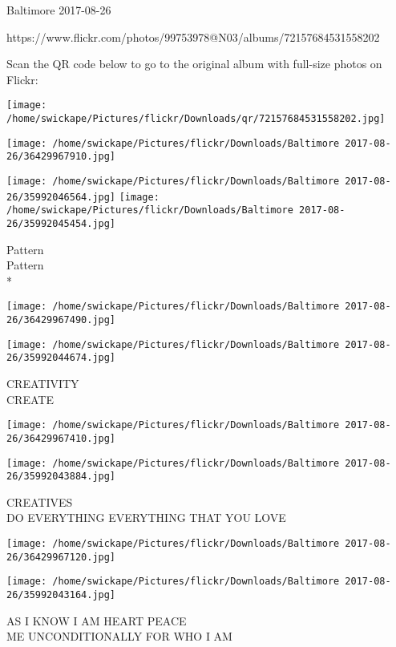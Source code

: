 \documentclass[10pt,letterpaper]{article}
\begin{document}
Baltimore 2017-08-26

https://www.flickr.com/photos/99753978@N03/albums/72157684531558202

Scan the QR code below to go to the original album with full-size photos on Flickr:

\texttt{[image: /home/swickape/Pictures/flickr/Downloads/qr/72157684531558202.jpg]}
\pagebreak

\texttt{[image: /home/swickape/Pictures/flickr/Downloads/Baltimore 2017-08-26/36429967910.jpg]}

\vspace{0.25in}
\texttt{[image: /home/swickape/Pictures/flickr/Downloads/Baltimore 2017-08-26/35992046564.jpg]}
\texttt{[image: /home/swickape/Pictures/flickr/Downloads/Baltimore 2017-08-26/35992045454.jpg]}

Pattern\\
Pattern\\
*\\
\pagebreak

\texttt{[image: /home/swickape/Pictures/flickr/Downloads/Baltimore 2017-08-26/36429967490.jpg]}

\vspace{0.25in}
\texttt{[image: /home/swickape/Pictures/flickr/Downloads/Baltimore 2017-08-26/35992044674.jpg]}

CREATIVITY\\
CREATE\\
\pagebreak

\texttt{[image: /home/swickape/Pictures/flickr/Downloads/Baltimore 2017-08-26/36429967410.jpg]}

\vspace{0.25in}
\texttt{[image: /home/swickape/Pictures/flickr/Downloads/Baltimore 2017-08-26/35992043884.jpg]}

CREATIVES\\
DO EVERYTHING EVERYTHING THAT YOU LOVE\\
\pagebreak

\texttt{[image: /home/swickape/Pictures/flickr/Downloads/Baltimore 2017-08-26/36429967120.jpg]}

\vspace{0.25in}
\texttt{[image: /home/swickape/Pictures/flickr/Downloads/Baltimore 2017-08-26/35992043164.jpg]}

AS I KNOW I AM HEART PEACE\\
ME UNCONDITIONALLY FOR WHO I AM\\
\pagebreak
\end{document}
